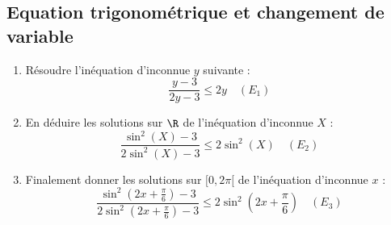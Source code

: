 \subsection{Equation trigonométrique et changement de variable}
\begin{exercice}
\begin{enumerate}
\item Résoudre l'inéquation d'inconnue $y$ suivante : 
$$\frac{y-3}{2y-3}\leq 2y \quad (E_1)$$

\item En déduire les solutions sur $\R$ de l'inéquation d'inconnue $X$  : 
$$\frac{\sin^2(X)-3}{2\sin^2(X) -3} \leq 2 \sin^2(X)\quad (E_2)$$

\item Finalement donner les solutions sur $[0,2\pi[ $ de l'inéquation d'inconnue $x$ : 
$$\frac{\sin^2(2x+\frac{\pi}{6})-3}{2\sin^2(2x+\frac{\pi}{6}) -3} \leq 2 \sin^2(2x+\frac{\pi}{6}) \quad (E_3)$$
\end{enumerate}

\end{exercice}

